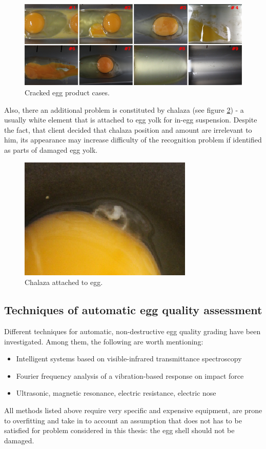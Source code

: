 \documentclass[12pt,twoside,a4paper]{article}
\begin{document}
\begin{figure}[H]
\centering
\includegraphics[width=0.8\paperwidth]{8of9}
\caption{Cracked egg product cases.}\label{fig:8of9}
\end{figure}
\newpage
Also, there an additional problem is constituted by chalaza (see figure \ref{fig:chalaza}) - a usually white element that is attached to egg yolk for in-egg suspension.
Despite the fact, that client decided that chalaza position and amount are irrelevant to him, its appearance may increase difficulty of the recognition problem if identified as parts of damaged egg yolk.

 
\begin{figure}[H]
\centering
\includegraphics[width=0.4\paperwidth]{chalaza}
\caption{Chalaza attached to egg.}\label{fig:chalaza}
\end{figure}


\subsection{Techniques of automatic egg quality assessment}

Different techniques for automatic, non-destructive egg quality grading have been investigated.
Among them, the following are worth mentioning:
\begin{itemize}
\item Intelligent systems based on visible-infrared transmittance spectroscopy\cite{agri}
\item Fourier frequency analysis of a vibration-based response on impact force\cite{svm} 
\item Ultrasonic, magnetic resonance, electric resistance, electric nose\cite{nondestr}  
\end{itemize}
All methods listed above require very specific and expensive equipment, are prone to overfitting and take in to account an assumption that does not has to be satisfied for problem considered in this thesis: the egg shell should not be damaged.
\end{document}
